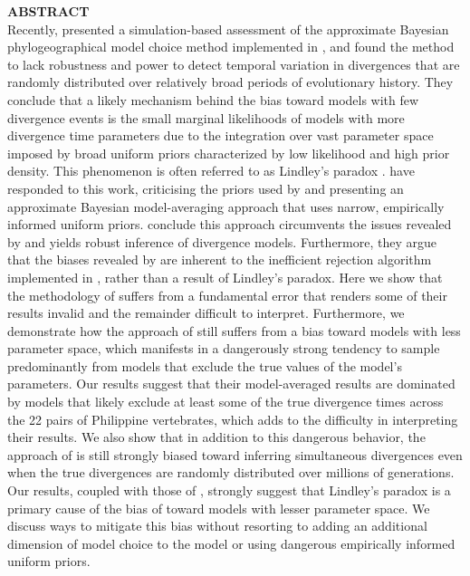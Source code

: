 \documentclass[letterpaper,12pt]{article}
\begin{document}
\begin{linenumbers}
{\sffamily
    \noindent\textbf{ABSTRACT} \\
    \noindent Recently, \citet{Oaks2012} presented a simulation-based
    assessment of the approximate Bayesian phylogeographical model choice
    method implemented in \msb, and found the method to lack robustness and
    power to detect temporal variation in divergences that are randomly
    distributed over relatively broad periods of evolutionary history.
    They conclude that a likely mechanism behind the bias toward models with
    few divergence events is the small marginal likelihoods of models with more
    divergence time parameters due to the integration over vast parameter space
    imposed by broad uniform priors characterized by low likelihood and high
    prior density.
    This phenomenon is often referred to as Lindley's paradox
    \citep{Lindley1957}.  \citet{Hickerson2013} have responded to this work,
    criticising the priors used by \citet{Oaks2012} and presenting an
    approximate Bayesian model-averaging approach that uses narrow, empirically
    informed uniform priors.
    \citet{Hickerson2013} conclude this approach circumvents the issues
    revealed by \citet{Oaks2012} and yields robust inference of divergence
    models.
    Furthermore, they argue that the biases revealed by \citet{Oaks2012} are
    inherent to the inefficient rejection algorithm implemented in \msb, rather
    than a result of Lindley's paradox.
    Here we show that the methodology of \citet{Hickerson2013} suffers from a
    fundamental error that renders some of their results invalid and the
    remainder difficult to interpret.
    Furthermore, we demonstrate how the approach of \citet{Hickerson2013} still
    suffers from a bias toward models with less parameter space, which
    manifests in a dangerously strong tendency to sample predominantly from
    models that exclude the true values of the model's parameters.
    Our results suggest that their model-averaged results are dominated by
    models that likely exclude at least some of the true divergence times
    across the 22 pairs of Philippine vertebrates, which adds to the
    difficulty in interpreting their results.
    We also show that in addition to this dangerous behavior, the approach of
    \citet{Hickerson2013} is still strongly biased toward inferring
    simultaneous divergences even when the true divergences are randomly
    distributed over millions of generations.
    Our results, coupled with those of \citet{Oaks2012}, strongly suggest that
    Lindley's paradox is a primary cause of the bias of \msb toward models with
    lesser parameter space.
    We discuss ways to mitigate this bias without resorting to adding an
    additional dimension of model choice to the model or using dangerous
    empirically informed uniform priors.

}
\end{linenumbers}
\end{document}
